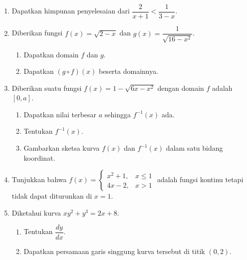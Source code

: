\documentclass[10pt,openany,a4paper]{article}
\theoremstyle{definition}
\theoremstyle{definition}
\theoremstyle{plain}
\begin{document}
\begin{enumerate}
    \item Dapatkan himpunan penyelesaian dari $\dfrac{2}{x+1}<\dfrac{1}{3-x}$.

    \item Diberikan fungsi $f(x)=\sqrt{2-x}$ dan $g(x)=\dfrac{1}{\sqrt{16-x^2}}$.
    \begin{enumerate}
        \item Dapatkan domain $f$ dan $g$.
        \item Dapatkan $(g\circ f)(x)$ beserta domainnya.
    \end{enumerate}

    \item Diberikan suatu fungsi $f(x)=1-\sqrt{6x-x^2}$ dengan domain $f$ adalah $[0,a]$.
    \begin{enumerate}
        \item Dapatkan nilai terbesar $a$ sehingga $f^{-1}(x)$ ada.
        \item Tentukan $f^{-1}(x)$.
        \item Gambarkan sketsa kurva $f(x)$ dan $f^{-1}(x)$ dalam satu bidang koordinat.
    \end{enumerate}

    \item Tunjukkan bahwa $f(x)=\begin{cases}
        x^2+1, & x\leq 1\\
        4x-2, & x>1
    \end{cases}$ adalah fungsi kontinu tetapi tidak dapat diturunkan di $x=1$.

    \item Diketahui kurva $xy^2+y^3=2x+8$.
    \begin{enumerate}
        \item Tentukan $\dfrac{dy}{dx}$.
        \item Dapatkan persamaan garis singgung kurva tersebut di titik $(0,2)$.
    \end{enumerate}
\end{enumerate}

\newpage
\end{document}
